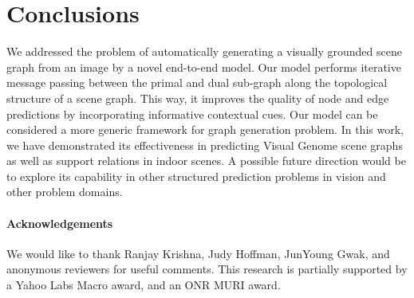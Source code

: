 \documentclass[10pt,twocolumn,letterpaper]{article}
\begin{document}
\section{Conclusions}

We addressed the problem of automatically generating a visually grounded scene graph from an image by a novel end-to-end model. Our model performs iterative message passing between the primal and dual sub-graph along the topological structure of a scene graph. This way, it improves the quality of node and edge predictions by incorporating informative contextual cues. Our model can be considered a more generic framework for graph generation problem. In this work, we have demonstrated its effectiveness in predicting Visual Genome scene graphs as well as support relations in indoor scenes. A possible future direction would be to explore its capability in other structured prediction problems in vision and other problem domains. 

\paragraph{Acknowledgements}  We would like to thank Ranjay Krishna, Judy Hoffman, JunYoung Gwak, and anonymous reviewers for useful comments. This research is partially supported by a Yahoo Labs Macro award, and an ONR MURI award.
{\small


}
\end{document}
